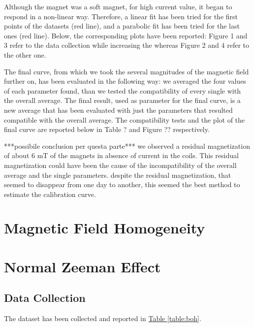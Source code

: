 \documentclass[a4paper,12pt,abstracton]{scrartcl}
\begin{document}


Although the magnet was a soft magnet, for high current value, it began to respond in a non-linear way. Therefore, a linear fit has been tried for the first points of the datasets (red line), and a parabolic fit has been tried for the last ones (red line). Below, the corresponding plots have been reported: Figure 1 and 3 refer to the data collection while increasing the whereas Figure 2 and 4 refer to the other one.


The final curve, from which we took the several magnitudes of the magnetic field further on, has been evaluated in the following way: we averaged the four values of each parameter found, than we tested the compatibility of every single with the overall average. The final result, used as parameter for the final curve, is a new average that has been evaluated with just the parameters that resulted compatible with the overall average. The compatibility tests and the plot of the final curve are reported below in Table ? and Figure ?? respectively.


***possibile conclusion per questa parte***
we observed a residual magnetization of about 6 mT of the magnets in absence of current in the coils. This residual magnetization could have been the cause of the incompatibility of the overall average and the single parameters. despite the residual magnetization, that seemed to disappear from one day to another, this seemed the best method to estimate the calibration curve.


\section{Magnetic Field Homogeneity}


\section{Normal Zeeman Effect}

\subsection{Data Collection}
The dataset has been collected and reported in \hyperref[table:boh]{Table \ref*{table:boh}}. \newline 
\end{document}
